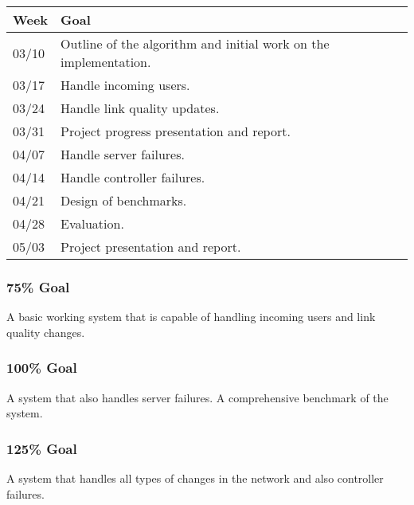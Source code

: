 \begin{center}
\begin{tabular}{| l || l | }
\hline
\textbf{Week} & \textbf{Goal} \\ \hline
03/10 & Outline of the algorithm and initial work on the implementation. \\ \hline
03/17 & Handle incoming users. \\ \hline
03/24 & Handle link quality updates. \\ \hline
03/31 & Project progress presentation and report. \\ \hline
04/07 & Handle server failures. \\ \hline
04/14 & Handle controller failures. \\ \hline
04/21 & Design of benchmarks. \\ \hline
04/28 & Evaluation. \\ \hline
05/03 & Project presentation and report. \\ \hline
\end{tabular}
\end{center}

\subsubsection{75\% Goal}

A basic working system that is capable of handling incoming users and link quality changes.

\subsubsection{100\% Goal}

A system that also handles server failures. A comprehensive benchmark of the system.

\subsubsection{125\% Goal}

A system that handles all types of changes in the network and also controller failures.
